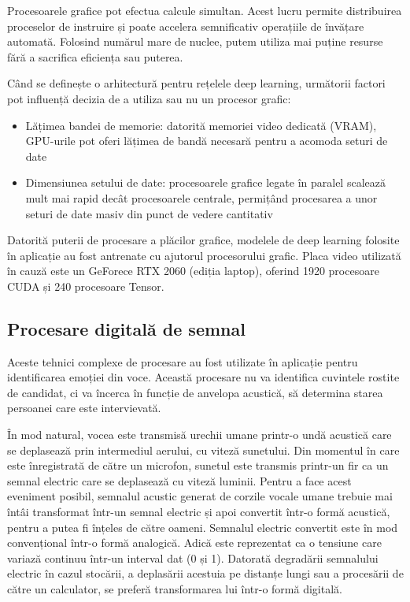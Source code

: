 \documentclass[a4paper, 12pt]{report}
\begin{document}
	Procesoarele grafice pot efectua calcule simultan. Acest lucru permite distribuirea proceselor de instruire și poate accelera semnificativ operațiile de învățare automată. Folosind numărul mare de nuclee, putem utiliza mai puține resurse fără a sacrifica eficiența sau puterea.
	
	Când se definește o arhitectură pentru rețelele deep learning, următorii factori pot influență decizia de a utiliza sau nu un procesor grafic:
	\begin{itemize}
		\item Lățimea bandei de memorie: datorită memoriei video dedicată (VRAM), GPU-urile pot oferi lățimea de bandă necesară pentru a acomoda seturi de date
		\item Dimensiunea setului de date: procesoarele grafice legate în paralel scalează mult mai rapid decât procesoarele centrale, permițând procesarea a unor seturi de date masiv din punct de vedere cantitativ
	\end{itemize}
	
	Datorită puterii de procesare a plăcilor grafice, modelele de deep learning folosite în aplicație au fost antrenate cu ajutorul procesorului grafic. Placa video utilizată în cauză este un GeForece RTX 2060 (ediția laptop), oferind 1920 procesoare CUDA și 240 procesoare Tensor.
	\clearpage

	\subsection{Procesare digitală de semnal}
	Aceste tehnici complexe de procesare au fost utilizate în aplicație pentru identificarea emoției din voce. Această procesare nu va identifica cuvintele rostite de candidat, ci va încerca în funcție de anvelopa acustică, să determina starea persoanei care este intervievată.

	În mod natural, vocea este transmisă urechii umane printr-o undă acustică care se deplasează prin intermediul aerului, cu viteză sunetului. Din momentul în care este înregistrată de către un microfon, sunetul este transmis printr-un fir ca un semnal electric care se deplasează cu viteză luminii. Pentru a face acest eveniment posibil, semnalul acustic generat de corzile vocale umane trebuie mai întâi transformat într-un semnal electric și apoi convertit într-o formă acustică, pentru a putea fi înțeles de către oameni. Semnalul electric convertit este în mod convențional într-o formă analogică. Adică este reprezentat ca o tensiune care variază continuu într-un interval dat (0 și 1). Datorată degradării semnalului electric în cazul stocării, a deplasării acestuia pe distanțe lungi sau a procesării de către un calculator, se preferă transformarea lui într-o formă digitală.
\end{document}
